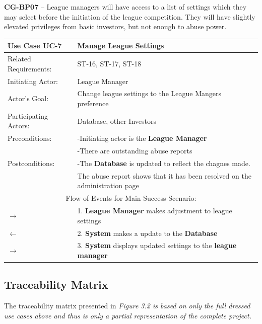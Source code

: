 \textbf{CG-BP07} – League managers will have access to a list of settings which they may
select before the initiation of the league competition. They will have slightly elevated
privileges from basic investors, but not enough to abuse power. \\

\begin{centering}
\renewcommand\arraystretch{1.3} %
\label{UC-7}
\begin{longtable}{|p{1.2in} p{5in}|}
\hline
\bfseries{\color{color1}Use Case UC-7} &
\bfseries{\color{color1}Manage League Settings} \\
\hline
Related Requirements: & ST-16, ST-17, ST-18 \\
Initiating Actor:     & League Manager \\
Actor's Goal:         & Change league settings to the League Mangers preference \\
Participating Actors: & Database, other Investors \\
Preconditions:        & -Initiating actor is the \textbf{League Manager} \\
                      & -There are outstanding abuse reports \\
Postconditions:       & -The \textbf{Database} is updated to reflect the chagnes made. \\
 & The abuse report shows that it has been resolved on the administration page\\
\hline
\multicolumn{2}{|c|}{\color{color1}Flow of Events for Main Success Scenario:}\\
\hline

$\rightarrow$ & 1. \textbf{League Manager} makes adjustment to league settings \\
$\leftarrow$ & 2. \textbf{System} makes a update to the \textbf{Database} \\
$\rightarrow$ & 3. \textbf{System} displays updated settings to the \textbf{league manager} \\
\hline

\end{longtable}
\end{centering}

\subsection{Traceability Matrix}

The traceability matrix presented in \em Figure 3.2 \em is based on only the full
dressed use cases above and thus is only a partial representation of the complete project.\\

